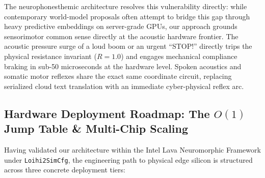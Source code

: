 \documentclass[journal,twocolumn]{IEEEtran}
\begin{document}
The neurophonesthemic architecture resolves this vulnerability directly: while contemporary world-model proposals often attempt to bridge this gap through heavy predictive embeddings on server-grade GPUs, our approach grounds sensorimotor common sense directly at the acoustic hardware frontier. The acoustic pressure surge of a loud boom or an urgent ``STOP!'' directly trips the physical resistance invariant ($R = 1.0$) and engages mechanical compliance braking in sub-50 microseconds at the hardware level. Spoken acoustics and somatic motor reflexes share the exact same coordinate circuit, replacing serialized cloud text translation with an immediate cyber-physical reflex arc.

\subsection{Hardware Deployment Roadmap: The $O(1)$ Jump Table \& Multi-Chip Scaling}
Having validated our architecture within the Intel Lava Neuromorphic Framework under \texttt{Loihi2SimCfg}, the engineering path to physical edge silicon is structured across three concrete deployment tiers:
\end{document}
